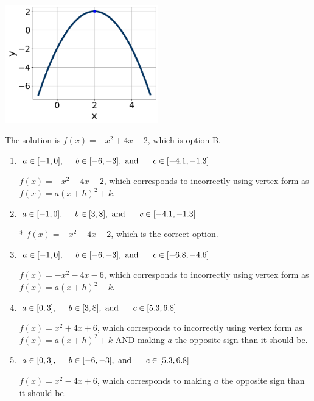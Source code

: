\documentclass{extbook}[14pt]
\begin{document}
\begin{enumerate}
{\begin{center}
    \includegraphics[width=0.5\textwidth]{../Figures/quadraticGraphToEquationC.png}
\end{center}


The solution is \( f(x) = -x^{2} +4 x -2 \), which is option B.\begin{enumerate}[label=\Alph*.]
\item \( a \in [-1, 0], \hspace*{5mm} b \in [-6, -3], \text{ and } \hspace*{5mm} c \in [-4.1, -1.3] \)

$f(x)=-x^{2} -4 x -2$, which corresponds to incorrectly using vertex form as $f(x) = a(x+h)^2+k$.
\item \( a \in [-1, 0], \hspace*{5mm} b \in [3, 8], \text{ and } \hspace*{5mm} c \in [-4.1, -1.3] \)

* $f(x)=-x^{2} +4 x -2$, which is the correct option.
\item \( a \in [-1, 0], \hspace*{5mm} b \in [-6, -3], \text{ and } \hspace*{5mm} c \in [-6.8, -4.6] \)

$f(x)=-x^{2} -4 x -6$, which corresponds to incorrectly using vertex form as $f(x) = a(x+h)^2 - k$.
\item \( a \in [0, 3], \hspace*{5mm} b \in [3, 8], \text{ and } \hspace*{5mm} c \in [5.3, 6.8] \)

$f(x)=x^{2} +4 x + 6$, which corresponds to incorrectly using vertex form as $f(x) = a(x+h)^2+k$ AND making $a$ the opposite sign than it should be.
\item \( a \in [0, 3], \hspace*{5mm} b \in [-6, -3], \text{ and } \hspace*{5mm} c \in [5.3, 6.8] \)

$f(x)=x^{2} -4 x + 6$, which corresponds to making $a$ the opposite sign than it should be.
\end{enumerate}

}
\end{enumerate}
\end{document}
